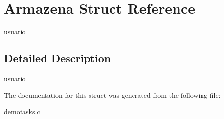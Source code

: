 \hypertarget{struct_armazena}{}\section{Armazena Struct Reference}
\label{struct_armazena}


usuario  




\subsection{Detailed Description}
usuario 

The documentation for this struct was generated from the following file\+:\begin{DoxyCompactItemize}
\item 
\mbox{\hyperlink{demotasks_8c}{demotasks.\+c}}\end{DoxyCompactItemize}

